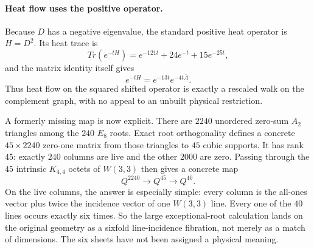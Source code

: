 \documentclass[11pt]{article}
\def\mathbb#1{#1}%
\def\mathrm#1{#1}%
\def\textbf#1{#1}%
\begin{document}
\paragraph{Heat flow uses the positive operator.}
Because $D$ has a negative eigenvalue, the standard positive heat
operator is $H=D^2$.  Its heat trace is
\[
\mathrm{Tr}(e^{-tH})
=e^{-121t}+24e^{-t}+15e^{-25t},
\]
and the matrix identity itself gives
\[
e^{-tH}=e^{-13t}e^{-4t\overline A}.
\]
Thus heat flow on the squared shifted operator is exactly a rescaled
walk on the complement graph, with no appeal to an unbuilt physical
restriction.

\begin{mathnote}
\textbf{A formerly missing map is now explicit.}
There are $2240$ unordered zero-sum $A_2$ triangles among the $240$
$E_8$ roots.  Exact root orthogonality defines a concrete
$45\times2240$ zero-one matrix from those triangles to $45$ cubic
supports.  It has rank $45$: exactly $240$ columns are live and the
other $2000$ are zero.  Passing through the $45$ intrinsic
$K_{4,4}$ octets of $W(3,3)$ then gives a concrete map
\[
\mathbb Q^{2240}\longrightarrow\mathbb Q^{45}
\longrightarrow\mathbb Q^{40}.
\]
On the live columns, the answer is especially simple: every column is
the all-ones vector plus twice the incidence vector of one $W(3,3)$
line.  Every one of the $40$ lines occurs exactly six times.  So the
large exceptional-root calculation lands on the original geometry as a
sixfold line-incidence fibration, not merely as a match of dimensions.
The six sheets have not been assigned a physical meaning.
\end{mathnote}
\end{document}
